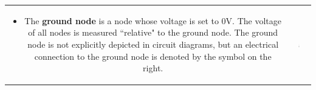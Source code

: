 \documentclass{article}
\begin{document}
\begin{tabular}{cc}
\parbox{0.75\textwidth}{
\begin{itemize}
\item The {\bf ground node} is a node whose voltage is set to \(0\text{V}\). The voltage of all nodes is measured ``relative" to the ground node. The ground node is not explicitly depicted in circuit diagrams, but an electrical connection to the ground node is denoted by the symbol on the right.
\end{itemize}
} & \parbox{0.25\textwidth}{
\includegraphics[width = 0.15\textwidth]{ground}
}
\end{tabular}
\end{document}
